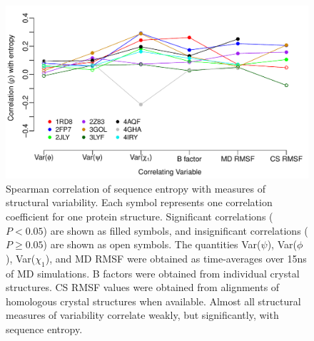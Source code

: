 \documentclass[smallextended]{svjour3}
\begin{document}
\begin{figure}[tbh]
\begin{center}
    \includegraphics[width=5in]{cor_entropy_SF.pdf}
\end{center}
\caption{Spearman correlation of sequence entropy with measures of structural variability. Each symbol represents one correlation coefficient for one protein structure. Significant correlations ($P<0.05$) are shown as filled symbols, and insignificant correlations ($P\geq0.05$) are shown as open symbols. The quantities Var($\psi$), Var($\phi$), Var($\chi_1$), and MD RMSF were obtained as time-averages over 15ns of MD simulations. B factors were obtained from individual crystal structures. CS RMSF values were obtained from alignments of homologous crystal structures when available. Almost all structural measures of variability correlate weakly, but significantly, with sequence entropy.}
\label{fig:cor_entropy_SF}
\end{figure}
\end{document}
